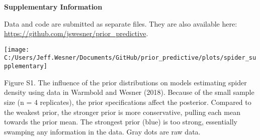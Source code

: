 \documentclass[
  12pt,
]{article}
\begin{document}
\newpage

\textbf{Supplementary Information}

Data and code are submitted as separate files. They are also available
here: \url{https://github.com/jswesner/prior_predictive}.

\texttt{[image: C:/Users/Jeff.Wesner/Documents/GitHub/prior\_predictive/plots/spider\_supplementary]}

Figure S1. The influence of the prior distributions on models estimating
spider density using data in Warmbold and Wesner (2018). Because of the
small sample size (n = 4 replicates), the prior specifications affect
the posterior. Compared to the weakest prior, the stronger prior is more
conservative, pulling each mean towards the prior mean. The strongest
prior (blue) is too strong, essentially swamping any information in the
data. Gray dots are raw data.
\end{document}
